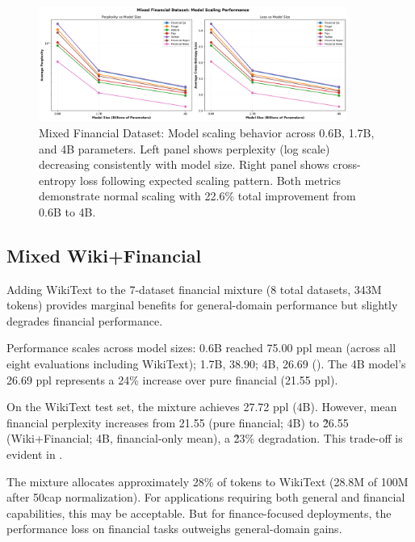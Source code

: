 \begin{figure}[htbp]
\centering
\includegraphics[width=0.9\textwidth]{figures/scaling_mixed_financial.png}
\caption[Mixed Financial Dataset: Scaling Behavior]{Mixed Financial Dataset: Model scaling behavior across 0.6B, 1.7B, and 4B parameters. Left panel shows perplexity (log scale) decreasing consistently with model size. Right panel shows cross-entropy loss following expected scaling pattern. Both metrics demonstrate normal scaling with 22.6\% total improvement from 0.6B to 4B.}
\label{fig:scaling_mixed_financial}
\end{figure}



\subsection{Mixed Wiki+Financial}

Adding WikiText to the 7-dataset financial mixture (8 total datasets, 343M tokens) provides marginal benefits for general-domain performance but slightly degrades financial performance.

Performance scales across model sizes: 0.6B reached 75.00 ppl mean (across all eight evaluations including WikiText); 1.7B, 38.90; 4B, 26.69 (). The 4B model's 26.69 ppl represents a 24\% increase over pure financial (21.55 ppl).

On the WikiText test set, the mixture achieves 27.72 ppl (4B). However, mean financial perplexity increases from 21.55 (pure financial; 4B) to \~26.55 (Wiki+Financial; 4B, financial-only mean), a \~23\% degradation. This trade-off is evident in .

The mixture allocates approximately 28\% of tokens to WikiText (28.8M of 100M after 50cap normalization). For applications requiring both general and financial capabilities, this may be acceptable. But for finance-focused deployments, the performance loss on financial tasks outweighs general-domain gains.

